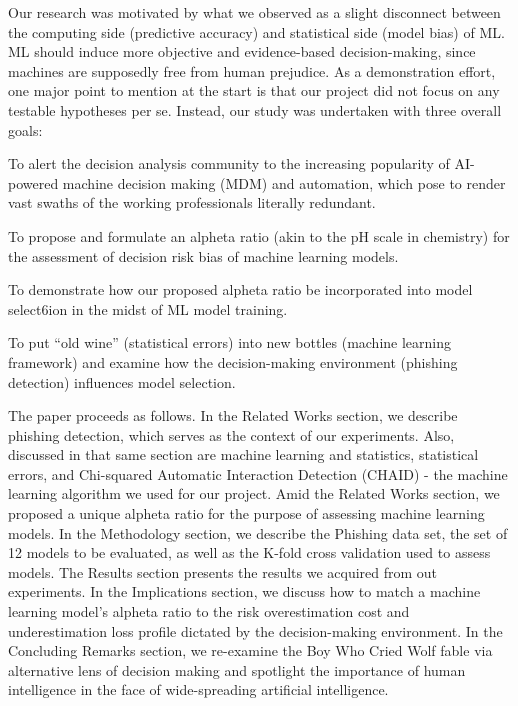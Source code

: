 \documentclass[deca,blindrev]{informs3}
\begin{document}
Our research was motivated by what we observed as a slight disconnect between the computing side (predictive accuracy) and statistical side (model bias) of ML. ML should induce  more objective and evidence-based decision-making, since machines are supposedly free from human prejudice. 
As a demonstration effort, one major point to mention at the start is that our project did not focus on any testable hypotheses per se. Instead, our study was undertaken with three overall goals:

\begin{henumerate}
\item To alert the decision analysis  community to the increasing popularity of AI-powered  machine decision making (MDM) and automation, which pose to render vast swaths of the working professionals literally redundant.

\item To propose and formulate an  alpheta ratio (akin to the pH scale in chemistry) for the assessment of decision risk bias of  machine learning models.
\item To demonstrate how our proposed alpheta ratio be incorporated into model select6ion in the midst of ML model training. 
\item To put “old wine” (statistical errors) into new bottles (machine learning framework) and examine how the decision-making environment (phishing detection) influences model selection.
\end{henumerate}

The paper proceeds as follows. In the Related Works section, we describe phishing detection, which serves as the context of our experiments. Also, discussed in that same section are machine learning and statistics, statistical errors, and Chi-squared Automatic Interaction Detection (CHAID) - the machine learning algorithm we used for our project. Amid the Related Works section, we proposed a unique  alpheta ratio for the purpose of assessing machine learning models. In the Methodology section, we describe the Phishing data set, the set of 12 models to be evaluated, as well as the K-fold cross validation used to assess models. The Results section presents the results we acquired from out experiments. In the Implications section, we discuss how to match a machine learning model’s  alpheta  ratio to the risk overestimation cost and underestimation loss profile dictated by the decision-making environment. In the Concluding Remarks section, we re-examine the Boy Who Cried Wolf fable via alternative lens of decision making and spotlight the importance of human intelligence in the face of wide-spreading artificial intelligence. 
\end{document}
